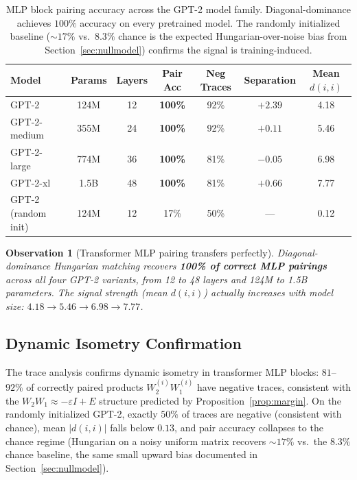 \documentclass[10pt]{article}
\newtheorem{observation}{Observation}
\theoremstyle{remark}
\begin{document}
\begin{table}[H]
\centering
\small
\renewcommand{\arraystretch}{1.1}
\begin{tabular}{lcccccc}
\toprule
Model & Params & Layers & Pair Acc & Neg Traces & Separation & Mean $d(i,i)$ \\
\midrule
GPT-2 & 124M & 12 & \textbf{100\%} & 92\% & $+2.39$ & 4.18 \\
GPT-2-medium & 355M & 24 & \textbf{100\%} & 92\% & $+0.11$ & 5.46 \\
GPT-2-large & 774M & 36 & \textbf{100\%} & 81\% & $-0.05$ & 6.98 \\
GPT-2-xl & 1.5B & 48 & \textbf{100\%} & 81\% & $+0.66$ & 7.77 \\
\midrule
GPT-2 (random init) & 124M & 12 & 17\% & 50\% & --- & 0.12 \\
\bottomrule
\end{tabular}
\caption{MLP block pairing accuracy across the GPT-2 model family.
Diagonal-dominance achieves $100\%$ accuracy on every pretrained model.
The randomly initialized baseline ($\sim$$17\%$ vs.\ $8.3\%$ chance is the
expected Hungarian-over-noise bias from Section~\ref{sec:nullmodel})
confirms the signal is training-induced.}
\label{tab:gpt2}
\end{table}

\begin{observation}[Transformer MLP pairing transfers perfectly]\label{obs:gpt2}
Diagonal-dominance Hungarian matching recovers \textbf{100\% of correct
MLP pairings} across all four GPT-2 variants, from 12 to 48 layers and
124M to 1.5B parameters. The signal strength (mean $d(i,i)$) actually
\emph{increases} with model size: $4.18 \to 5.46 \to 6.98 \to 7.77$.
\end{observation}

\subsection{Dynamic Isometry Confirmation}

The trace analysis confirms dynamic isometry in transformer MLP blocks:
$81$--$92\%$ of correctly paired products $W_2^{(i)} W_1^{(i)}$ have negative
traces, consistent with the $W_2 W_1 \approx -\varepsilon I + E$ structure
predicted by Proposition~\ref{prop:margin}. On the randomly initialized
GPT-2, exactly $50\%$ of traces are negative (consistent with chance),
mean $|d(i,i)|$ falls below $0.13$, and pair accuracy collapses to the
chance regime (Hungarian on a noisy uniform matrix recovers $\sim$$17\%$
vs.\ the $8.3\%$ chance baseline, the same small upward bias documented
in Section~\ref{sec:nullmodel}).
\end{document}
